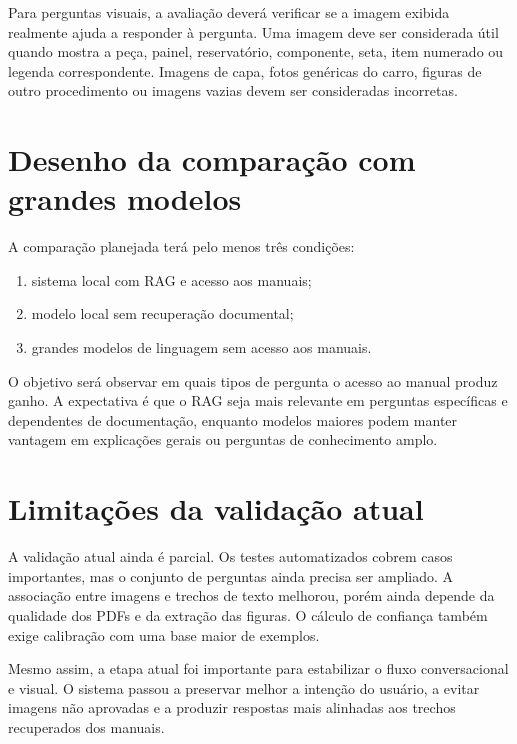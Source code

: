 Para perguntas visuais, a avaliação deverá verificar se a imagem exibida realmente ajuda a responder à pergunta. Uma imagem deve ser considerada útil quando mostra a peça, painel, reservatório, componente, seta, item numerado ou legenda correspondente. Imagens de capa, fotos genéricas do carro, figuras de outro procedimento ou imagens vazias devem ser consideradas incorretas.

\section{Desenho da comparação com grandes modelos}

A comparação planejada terá pelo menos três condições:

\begin{enumerate}
  \item sistema local com RAG e acesso aos manuais;
  \item modelo local sem recuperação documental;
  \item grandes modelos de linguagem sem acesso aos manuais.
\end{enumerate}

O objetivo será observar em quais tipos de pergunta o acesso ao manual produz ganho. A expectativa é que o RAG seja mais relevante em perguntas específicas e dependentes de documentação, enquanto modelos maiores podem manter vantagem em explicações gerais ou perguntas de conhecimento amplo.

\section{Limitações da validação atual}

A validação atual ainda é parcial. Os testes automatizados cobrem casos importantes, mas o conjunto de perguntas ainda precisa ser ampliado. A associação entre imagens e trechos de texto melhorou, porém ainda depende da qualidade dos PDFs e da extração das figuras. O cálculo de confiança também exige calibração com uma base maior de exemplos.

Mesmo assim, a etapa atual foi importante para estabilizar o fluxo conversacional e visual. O sistema passou a preservar melhor a intenção do usuário, a evitar imagens não aprovadas e a produzir respostas mais alinhadas aos trechos recuperados dos manuais.

